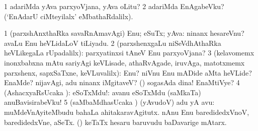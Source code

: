 \noindent 
\gl{\pagu}
\expl{}
\bmng
\bnum
\num{1}    adariMda yAva parxyoVjana, yAva oLitu? 
\num{2}  adariMda EnAgabeVku? (`EnAdarU ciMteyilalx' eMbathaRdalilx). 
\enum
\emng
\eentry

\bentry
{} 
\gl{\sanA}
\expl{}
\bmng
\bnum
\num{1} (parxshAnxthaRka savaRnAmavAgi) Enu; eSuTx; yAva:  ninanx hesareVnu?  avaLu Enu heVLidaLoV tiLiyadu. 
\num{2} (parxshenxgaLu niSeVdhAthaRka heVLikegaLa rUpadalilx):  parxyatinxsi tAneV Enu parxyoVjana? 
\num{3} (kelavomemx inonxbabxna mAtu sariyAgi keVLisade, athaRvAgade, iruvAga, matotxmemx parxshenx, sapxSaTxne, keVLuvalilx):  Enu? niVnu Enu mADide aMta heVLide?  EnaMde? nijavAgi, adu ninanx iMgitaveV? (\AmA)  sogasAda dina! EnaMtiVye? 
\num{4} (AshacxyaRsUcaka \sanA): eSoTxMdu!:  avanu eSoTxMdu (saMkaTa) anuBavisirabeVku! 
\hypertarget{what(2)5}{} 
\hypertarget{what2 pagu5}{} 
\num{5} (saMbaMdhasUcaka \sanA) (yAvudoV) adu yA avu:  muMdeVnAyiteMbudu bahaLa ahitakaravAgitutx.  nAnu Enu baredidedxVnoV, baredidedxVne, aSeTx.  (\ashi) keTaTx hesaru baruvudu baDavarige mAtarx. 
\enum
\emng

